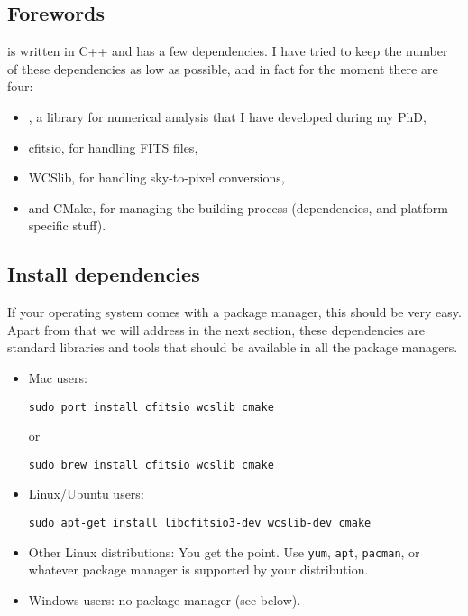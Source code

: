 \subsection{Forewords}

\egg is written in C++ and has a few dependencies. I have tried to keep the number of these dependencies as low as possible, and in fact for the moment there are four:

\begin{itemize}
\item \vif, a library for numerical analysis that I have developed during my PhD,
\item cfitsio, for handling FITS files,
\item WCSlib, for handling sky-to-pixel conversions,
\item and CMake, for managing the building process (dependencies, and platform specific stuff).
\end{itemize}

\subsection{Install dependencies}

If your operating system comes with a package manager, this should be very easy. Apart from \vif that we will address in the next section, these dependencies are standard libraries and tools that should be available in all the package managers.

\begin{itemize}
\item Mac users:
\begin{verbatim}
sudo port install cfitsio wcslib cmake
\end{verbatim}
or
\begin{verbatim}
sudo brew install cfitsio wcslib cmake
\end{verbatim}
\item Linux/Ubuntu users:
\begin{verbatim}
sudo apt-get install libcfitsio3-dev wcslib-dev cmake
\end{verbatim}
\item Other Linux distributions: You get the point. Use \texttt{yum}, \texttt{apt}, \texttt{pacman}, or whatever package manager is supported by your distribution.
\item Windows users: no package manager (see below).
\end{itemize}


